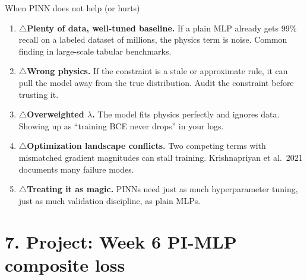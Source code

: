 \documentclass[aspectratio=169,10pt]{beamer}
\newcommand{\warnitem}{\textcolor{warnorange}{\Large$\triangle$}\;}
\begin{document}
\begin{frame}{When PINN does not help (or hurts)}
\begin{enumerate}
  \item \warnitem \textbf{Plenty of data, well-tuned baseline.} If a plain MLP already gets 99\% recall on a labeled dataset of millions, the physics term is noise. Common finding in large-scale tabular benchmarks.
  \item \warnitem \textbf{Wrong physics.} If the constraint is a stale or approximate rule, it can pull the model away from the true distribution. Audit the constraint before trusting it.
  \item \warnitem \textbf{Overweighted $\lambda$.} The model fits physics perfectly and ignores data. Showing up as ``training BCE never drops'' in your logs.
  \item \warnitem \textbf{Optimization landscape conflicts.} Two competing terms with mismatched gradient magnitudes can stall training. Krishnapriyan et al.\ 2021 documents many failure modes.
  \item \warnitem \textbf{Treating it as magic.} PINNs need just as much hyperparameter tuning, just as much validation discipline, as plain MLPs.
\end{enumerate}
\end{frame}

\section*{7. Project: Week 6 PI-MLP composite loss}
\end{document}
